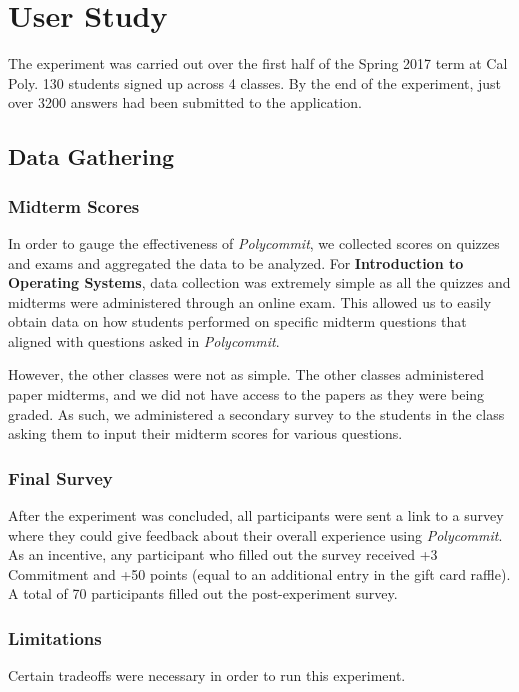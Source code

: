 \chapter{User Study}

\par The experiment was carried out over the first half of the Spring 2017 term at Cal Poly. 130 students signed up across 4 classes. By the end of the experiment, just over 3200 answers had been submitted to the application.

\section{Data Gathering}

\subsection{Midterm Scores}
\par In order to gauge the effectiveness of \textit{Polycommit}, we collected scores on quizzes and exams and aggregated the data to be analyzed. For \textbf{Introduction to Operating Systems}, data collection was extremely simple as all the quizzes and midterms were administered through an online exam. This allowed us to easily obtain data on how students performed on specific midterm questions that aligned with questions asked in \textit{Polycommit}.

\par However, the other classes were not as simple. The other classes administered paper midterms, and we did not have access to the papers as they were being graded. As such, we administered a secondary survey to the students in the class asking them to input their midterm scores for various questions.

\subsection{Final Survey}
\par After the experiment was concluded, all participants were sent a link to a survey where they could give feedback about their overall experience using \textit{Polycommit}. As an incentive, any participant who filled out the survey received +3 Commitment and +50 points (equal to an additional entry in the gift card raffle). A total of 70 participants filled out the post-experiment survey.

\subsection{Limitations}
\par Certain tradeoffs were necessary in order to run this experiment.
